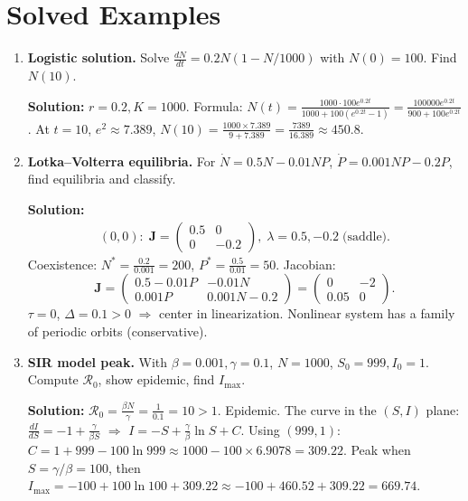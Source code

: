 \documentclass[12pt,a4paper]{book}
\begin{document}
\section{Solved Examples}
\begin{enumerate}[leftmargin=*, label=\textbf{Example 3.\arabic*}]
    \item \textbf{Logistic solution.}
    Solve $\frac{dN}{dt} = 0.2 N(1 - N/1000)$ with $N(0)=100$. Find $N(10)$.

    \textbf{Solution:} $r=0.2, K=1000$. Formula:
    $N(t) = \frac{1000 \cdot 100 e^{0.2t}}{1000 + 100(e^{0.2t}-1)} = \frac{100000 e^{0.2t}}{900 + 100 e^{0.2t}}$.
    At $t=10$, $e^2 \approx 7.389$, $N(10) = \frac{1000 \times 7.389}{9 + 7.389} = \frac{7389}{16.389} \approx 450.8$.

    \item \textbf{Lotka–Volterra equilibria.}
    For $\dot{N}=0.5N - 0.01 N P$, $\dot{P}=0.001 N P - 0.2 P$, find equilibria and classify.

    \textbf{Solution:}
    \begin{align*}
        (0,0):\; \mathbf{J} = \begin{pmatrix}0.5 & 0 \\ 0 & -0.2\end{pmatrix}, \; \lambda=0.5,-0.2 \;\text{(saddle)}.
    \end{align*}
    Coexistence: $N^* = \frac{0.2}{0.001}=200$, $P^* = \frac{0.5}{0.01}=50$. Jacobian:
    \[
    \mathbf{J} = \begin{pmatrix} 0.5-0.01 P & -0.01 N \\ 0.001 P & 0.001 N - 0.2 \end{pmatrix} = \begin{pmatrix} 0 & -2 \\ 0.05 & 0 \end{pmatrix}.
    \]
    $\tau=0$, $\Delta=0.1>0$ $\Rightarrow$ center in linearization. Nonlinear system has a family of periodic orbits (conservative).

    \item \textbf{SIR model peak.}
    With $\beta=0.001, \gamma=0.1$, $N=1000$, $S_0=999, I_0=1$. Compute $\mathcal{R}_0$, show epidemic, find $I_{\max}$.

    \textbf{Solution:} $\mathcal{R}_0 = \frac{\beta N}{\gamma} = \frac{1}{0.1}=10>1$. Epidemic. The curve in the $(S,I)$ plane: $\frac{dI}{dS} = -1 + \frac{\gamma}{\beta S}$ $\Rightarrow$ $I = -S + \frac{\gamma}{\beta}\ln S + C$.
    Using $(999,1)$: $C = 1 + 999 - 100 \ln 999 \approx 1000 - 100\times 6.9078 = 309.22$.
    Peak when $S = \gamma/\beta = 100$, then $I_{\max} = -100 + 100\ln 100 + 309.22 \approx -100 + 460.52 + 309.22 = 669.74$.


\end{enumerate}
\end{document}
